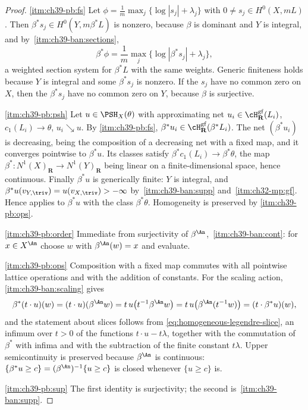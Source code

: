 \begin{proof}
\cref{itm:ch39-pb:fs}  Let
$\phi=\frac1m\max_j\{\log|s_j|+\lambda_j\}$ with
$0\ne s_j\in H^0(X,mL)$.  Then $\beta^*s_j\in H^0(Y,m\beta^*L)$ is
nonzero, because $\beta$ is dominant and $Y$ is integral, and by
\,\cref{itm:ch39-ban:sections},
\[
 \beta^*\phi=\frac1m\max_j\{\log|\beta^*s_j|+\lambda_j\},
\]
a weighted section system for $\beta^*L$ with the same weights.  Generic
finiteness holds because $Y$ is integral and some $\beta^*s_j$ is
nonzero.  If the $s_j$ have no common zero on $X$, then the
$\beta^*s_j$ have no common zero on $Y$, because
$\beta$ is surjective.

\cref{itm:ch39-pb:psh}  Let $u\in\PSH_X(\theta)$ with approximating net
$u_i\in\cH^{\mathrm{gf}}_{\mathbf R}(L_i)$, $c_1(L_i)\to\theta$,
$u_i\searrow u$.  By \cref{itm:ch39-pb:fs},
$\beta^*u_i\in\cH^{\mathrm{gf}}_{\mathbf R}(\beta^*L_i)$.  The net
$(\beta^*u_i)$ is decreasing, being the composition of a decreasing net
with a fixed map, and it converges pointwise to $\beta^*u$.  Its classes
satisfy $\beta^*c_1(L_i)\to\beta^*\theta$, the map
$\beta^*:N^1(X)_{\mathbf R}\to N^1(Y)_{\mathbf R}$ being linear on a
finite-dimensional space, hence continuous.  Finally $\beta^*u$ is
generically finite: $Y$ is integral, and
$\beta^*u(v_{Y,\triv})=u(v_{X,\triv})>-\infty$ by
\,\cref{itm:ch39-ban:supp} and
\,\cref{itm:ch32-mp:gf}.  Hence
 applies to $\beta^*u$ with the class
$\beta^*\theta$.  Homogeneity is preserved by
\cref{itm:ch39-pb:ops}.

\cref{itm:ch39-pb:order}  Immediate from surjectivity of $\beta^{\An}$,
\,\cref{itm:ch39-ban:cont}: for $x\in X^{\An}$
choose $w$ with $\beta^{\An}(w)=x$ and evaluate.

\cref{itm:ch39-pb:ops}  Composition with a fixed map commutes with all
pointwise lattice operations and with the addition of constants.  For the
scaling action, \,\cref{itm:ch39-ban:scaling} gives
\[
 \beta^*(t\cdot u)(w)=(t\cdot u)(\beta^{\An}w)
 =t\,u\bigl(t^{-1}\beta^{\An}w\bigr)
 =t\,u\bigl(\beta^{\An}(t^{-1}w)\bigr)
 =(t\cdot\beta^*u)(w),
\]
and the statement about slices follows from
\eqref{eq:homogeneous-legendre-slice}, an infimum over $t>0$ of the
functions $t\cdot u-t\lambda$, together with the commutation of
$\beta^*$ with infima and with the subtraction of the finite constant
$t\lambda$.  Upper semicontinuity is preserved because $\beta^{\An}$ is
continuous: $\{\beta^*u\ge c\}=(\beta^{\An})^{-1}\{u\ge c\}$ is closed
whenever $\{u\ge c\}$ is.

\cref{itm:ch39-pb:sup}  The first identity is surjectivity; the second is
\,\cref{itm:ch39-ban:supp}.
\end{proof}

